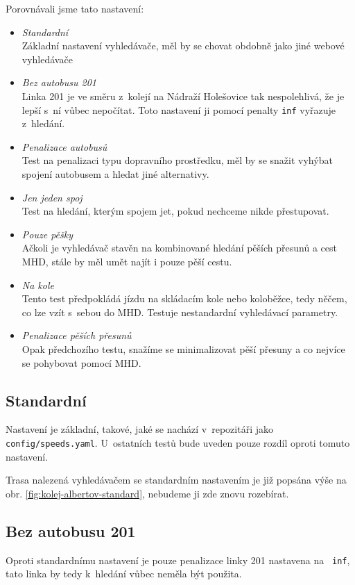 Porovnávali jsme tato nastavení:
\begin{itemize}
	\item {\em Standardní}\\Základní nastavení vyhledávače, měl by se chovat
	obdobně jako jiné webové vyhledávače
	\item {\em Bez autobusu 201}\\ Linka 201 je ve směru z~kolejí na Nádraží
	Holešovice tak nespolehlivá, že je lepší s~ní vůbec nepočítat. Toto
	nastavení ji pomocí penalty {\tt inf} vyřazuje z~hledání.
	\item {\em Penalizace autobusů}\\ Test na penalizaci typu dopravního
	prostředku, měl by se snažit vyhýbat spojení autobusem a hledat jiné
	alternativy.
	\item {\em Jen jeden spoj}\\ Test na hledání, kterým spojem jet, pokud
	nechceme nikde přestupovat.
	\item {\em Pouze pěšky}\\ Ačkoli je vyhledávač stavěn na kombinované hledání
	pěších přesunů a cest MHD, stále by měl umět najít i pouze pěší cestu.
	\item {\em Na kole}\\ Tento test předpokládá jízdu na skládacím kole nebo
	koloběžce, tedy něčem, co lze vzít s~sebou do MHD. Testuje nestandardní
	vyhledávací parametry.
	\item {\em Penalizace pěších přesunů}\\ Opak předchozího testu, snažíme se
	minimalizovat pěší přesuny a co nejvíce se pohybovat pomocí MHD.
\end{itemize}
\subsection{Standardní}
Nastavení je základní, takové, jaké se nachází v~repozitáři jako {\tt
config/speeds.yaml}. U~ostatních testů bude uveden pouze rozdíl oproti tomuto
nastavení.

Trasa nalezená vyhledávačem se standardním nastavením je již popsána výše na
obr. \ref{fig:kolej-albertov-standard}, nebudeme ji zde znovu rozebírat.
\subsection{Bez autobusu 201}
Oproti standardnímu nastavení je pouze penalizace linky 201 nastavena na {\tt
inf}, tato linka by tedy k~hledání vůbec neměla být použita.

